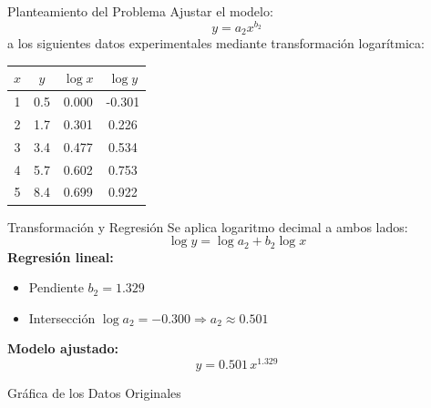 \documentclass[main.tex]{subfiles}
\begin{document}
\begin{frame}{Planteamiento del Problema}
  \small
  Ajustar el modelo:
  \[
    y = a_2 x^{b_2}
  \]
  a los siguientes datos experimentales mediante transformación logarítmica:

  \begin{center}
    \begin{tabular}{cc|cc}
    \hline
    \(x\) & \(y\) & \(\log x\) & \(\log y\) \\
    \hline
    1 & 0.5 & 0.000 & -0.301 \\
    2 & 1.7 & 0.301 & 0.226 \\
    3 & 3.4 & 0.477 & 0.534 \\
    4 & 5.7 & 0.602 & 0.753 \\
    5 & 8.4 & 0.699 & 0.922 \\
    \hline
    \end{tabular}
  \end{center}
\end{frame}

\begin{frame}{Transformación y Regresión}
  \small
  Se aplica logaritmo decimal a ambos lados:
  \[
    \log y = \log a_2 + b_2 \log x
  \]
  \textbf{Regresión lineal:}
  \begin{itemize}
    \item Pendiente \(b_2 = 1.329\)
    \item Intersección \(\log a_2 = -0.300 \Rightarrow a_2 \approx 0.501\)
  \end{itemize}
  \textbf{Modelo ajustado:}
  \[
    y = 0.501 \, x^{1.329}
  \]
\end{frame}

\begin{frame}{Gráfica de los Datos Originales}
  \begin{center}
  \end{center}
\end{frame}
\end{document}
